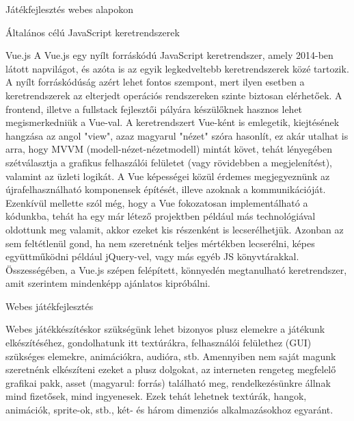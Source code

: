 \begin{MyChapter}{Játékfejlesztés webes alapokon}
\begin{MySection}{Általános célú JavaScript keretrendszerek}
		\begin{MySubSection}{Vue.js}
			A Vue.js egy nyílt forráskódú JavaScript keretrendszer, amely 2014-ben látott napvilágot, és azóta is az egyik legkedveltebb keretrendszerek közé tartozik. A nyílt forráskódúság azért lehet fontos szempont, mert ilyen esetben a keretrendszerek az elterjedt operációs rendszereken szinte biztosan elérhetőek. A frontend, illetve a fullstack fejlesztői pályára készülőknek hasznos lehet megismerkedniük a Vue-val.
			A keretrendszert Vue-ként is emlegetik, kiejtésének hangzása az angol "view", azaz magyarul "nézet" szóra hasonlít, ez akár utalhat is arra, hogy MVVM (modell-nézet-nézetmodell) mintát követ, tehát lényegében szétválasztja a grafikus felhaszálói felületet (vagy rövidebben a megjelenítést), valamint az üzleti logikát.
			A Vue képességei közül érdemes megjegyeznünk az újrafelhasználható komponensek építését, illeve azoknak a kommunikációját.
			Ezenkívül mellette szól még, hogy a Vue fokozatosan implementálható a kódunkba, tehát ha egy már létező projektben például más technológiával oldottunk meg valamit, akkor ezeket kis részenként is lecserélhetjük. Azonban az sem feltétlenül gond, ha nem szeretnénk teljes mértékben lecserélni, képes együttműködni például jQuery-vel, vagy más egyéb JS könyvtárakkal.
			Összességében, a Vue.js szépen felépített, könnyedén megtanulható keretrendszer, amit szerintem mindenképp ajánlatos kipróbálni.
		\end{MySubSection}
	\end{MySection}

	\begin{MySection}{Webes játékfejlesztés}
		
		Webes játékkészítéskor szükségünk lehet bizonyos plusz elemekre a játékunk elkészítéséhez, gondolhatunk itt textúrákra, felhasználói felülethez (GUI) szükséges elemekre, animációkra, audióra, stb. Amennyiben nem saját magunk szeretnénk elkészíteni ezeket a plusz dolgokat, az interneten rengeteg megfelelő grafikai pakk, asset (magyarul: forrás) található meg, rendelkezésünkre állnak mind fizetősek, mind ingyenesek. Ezek tehát lehetnek textúrák, hangok, animációk, sprite-ok, stb., két- és három dimenziós alkalmazásokhoz egyaránt. 
		

\end{MySection}
\end{MyChapter}
